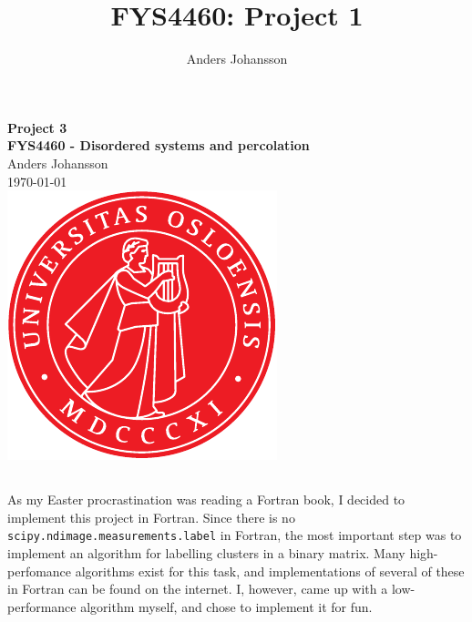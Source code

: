 \documentclass[11pt,british,a4paper]{report}
\begin{document}
\title{FYS4460: Project 1}
\author{Anders Johansson}

\begin{titlepage}
\vspace*{\fill}
\begin{center}
\textsf{
    \Huge \textbf{Project 3}\\\vspace{0.5cm}
    \Large \textbf{FYS4460 - Disordered systems and percolation}\\
    \vspace{8cm}
    Anders Johansson\\
    \today\\
}
\vspace{1.5cm}
\includegraphics{uio.pdf}\\
\vspace*{\fill}
\end{center}
\end{titlepage}
\null
\pagestyle{empty}
\newpage

\pagestyle{fancy}
\setcounter{page}{1}



%
\subsection{}
As my Easter procrastination was reading a Fortran book\cite{brainerd_guide_2015}, I decided to implement this project in Fortran. Since there is no \lstinline{scipy.ndimage.measurements.label} in Fortran, the most important step was to implement an algorithm for labelling clusters in a binary matrix. Many high-perfomance algorithms exist for this task, and implementations of several of these in Fortran can be found on the internet. I, however, came up with a low-performance algorithm myself, and chose to implement it for fun.
\end{document}
